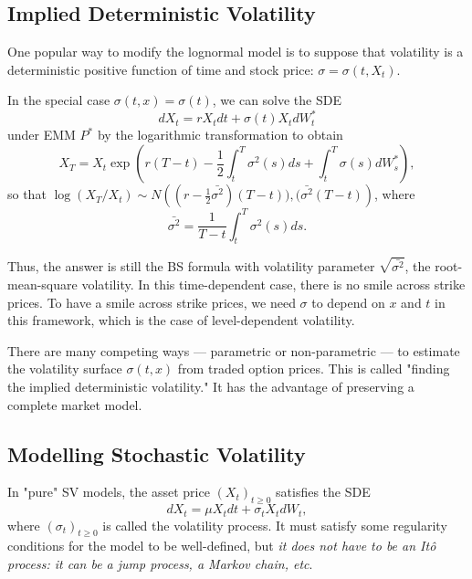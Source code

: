 \documentclass[a4paper,12pt]{article}
\numberwithin{equation}{section}
\theoremstyle{definition}
\theoremstyle{remark}
\begin{document}
\subsection{Implied Deterministic Volatility}
One popular way to modify the lognormal model is to suppose that 
volatility is a deterministic positive function of time and stock 
price: $\sigma=\sigma(t,X_{t})$. 

In the special case $\sigma(t,x)=\sigma(t)$, we can solve the SDE
\begin{equation}
    dX_{t}=rX_{t}dt+\sigma(t)X_{t}dW_{t}^{*}
\end{equation}
under EMM $P^{*}$ by the logarithmic transformation to obtain 
\begin{equation}
    X_{T}=X_{t}\exp\left(r(T-t)-\frac{1}{2}
    \int_{t}^{T} \sigma^{2}(s) ds 
    +\int_{t}^{T} \sigma(s) dW_{s}^{*}\right),
\end{equation}
so that $\log(X_{T}/X_{t}) \sim N\left((r-\frac{1}{2}\bar{\sigma^{2}})(T-t)),(\bar{\sigma^{2}}(T-t)\right)$, 
where 
\begin{equation}
    \bar{\sigma^{2}}=\frac{1}{T-t}\int_{t}^{T} \sigma^{2}(s) ds.
\end{equation}

Thus, the answer is still the BS formula with volatility parameter 
$\sqrt{\bar{\sigma^{2}}}$, the root-mean-square volatility. In this 
time-dependent case, there is no smile across strike prices. To 
have a smile across strike prices, we need $\sigma$ to depend on $x$ 
and $t$ in this framework, which is the case of level-dependent 
volatility.

There are many competing ways --- parametric or non-parametric --- 
to estimate the volatility surface $\sigma(t,x)$ from traded option 
prices. This is called "finding the implied deterministic 
volatility." It has the advantage of preserving a complete market 
model.

\subsection{Modelling Stochastic Volatility}
In "pure" SV models, the asset price $(X_{t})_{t\geq 0}$ satisfies 
the SDE 
\begin{equation}
\label{eq:stochastic_volatility_asset_price}
    dX_{t}=\mu X_{t}dt+\sigma_{t}X_{t}dW_{t},
\end{equation}
where $(\sigma_{t})_{t\geq 0}$ is called the volatility process. 
It must satisfy some regularity conditions for the model to be 
well-defined, but \textit{it does not have to be an It\^o process: 
it can be a jump process, a Markov chain, etc}.
\end{document}
